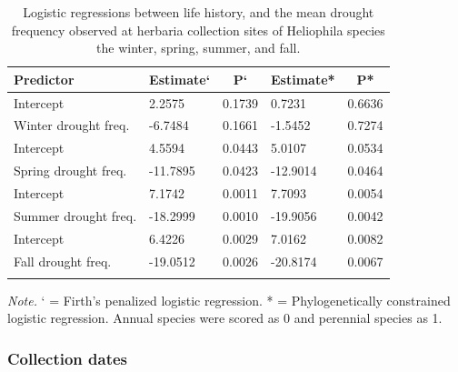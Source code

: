 \documentclass[man,floatsintext]{apa6}
\theoremstyle{definition}
\theoremstyle{definition}
\theoremstyle{definition}
\theoremstyle{remark}
\begin{document}
\begin{table}[tbp]
\begin{center}
\begin{threeparttable}
\caption{\label{tab:modelstable}Logistic regressions between life history, and the mean drought frequency observed at herbaria collection sites of Heliophila species the winter, spring, summer, and fall.}
\begin{tabular}{lllll}
\toprule
Predictor & \multicolumn{1}{c}{Estimate`} & \multicolumn{1}{c}{P`} & \multicolumn{1}{c}{Estimate*} & \multicolumn{1}{c}{P*}\\
\midrule
Intercept & 2.2575 & 0.1739 & 0.7231 & 0.6636\\
Winter drought freq. & -6.7484 & 0.1661 & -1.5452 & 0.7274\\ \midrule
Intercept & 4.5594 & 0.0443 & 5.0107 & 0.0534\\
Spring drought freq. & -11.7895 & 0.0423 & -12.9014 & 0.0464\\ \midrule
Intercept & 7.1742 & 0.0011 & 7.7093 & 0.0054\\
Summer drought freq. & -18.2999 & 0.0010 & -19.9056 & 0.0042\\ \midrule
Intercept & 6.4226 & 0.0029 & 7.0162 & 0.0082\\
Fall drought freq. & -19.0512 & 0.0026 & -20.8174 & 0.0067\\ \midrule
\bottomrule
\addlinespace
\end{tabular}
\begin{tablenotes}[para]
\normalsize{\textit{Note.} ` = Firth's penalized logistic regression. * = Phylogenetically constrained logistic regression. Annual species were scored as 0 and perennial species as 1.}
\end{tablenotes}
\end{threeparttable}
\end{center}
\end{table}

\hypertarget{collection-dates-1}{%
\subsubsection{Collection dates}\label{collection-dates-1}}
\end{document}
